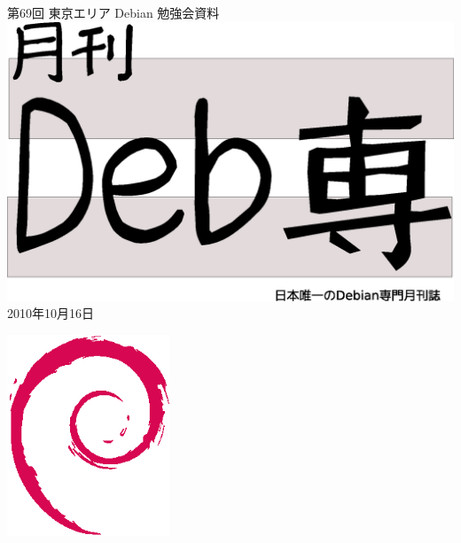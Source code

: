 \documentclass[mingoth,a4paper]{jsarticle}
\newcommand{\debmtgyear}{2010}
\newcommand{\debmtgmonth}{10}
\newcommand{\debmtgdate}{16}
\newcommand{\debmtgnumber}{69}
\begin{document}
\begin{titlepage}
\thispagestyle{empty}

\vspace*{-2cm}
第\debmtgnumber{}回 東京エリア Debian 勉強会資料\\
\hspace*{-2cm}
\includegraphics[width=210mm]{image201003/debsen.eps}\\
\hfill{}\debmtgyear{}年\debmtgmonth{}月\debmtgdate{}日


\vspace*{-2cm}
\hfill{}\includegraphics[height=6cm]{image200502/openlogo-nd.eps}
\end{titlepage}

\end{document}
